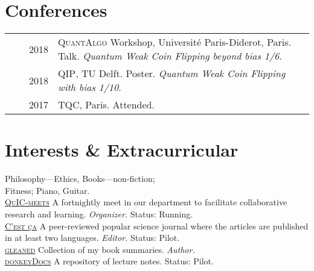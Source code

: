 \documentclass[a4paper,10pt]{article}
\begin{document}
\section{Conferences}
\begin{tabular}{rrp{11cm}}
  & ~~2018 &\textsc{QuantAlgo} Workshop, Université Paris-Diderot, Paris. Talk. \emph{Quantum Weak Coin Flipping beyond bias 1/6}. \\  
  & ~~2018 &\textsc{QIP}, TU Delft. Poster. \emph{Quantum Weak Coin Flipping with bias 1/10}. \\
  & ~~2017 &\textsc{TQC}, Paris. Attended.
  \end{tabular}


\section{Interests \& Extracurricular}
Philosophy---Ethics, Books---non-fiction; \\
Fitness; Piano, Guitar. \\

\textsc{\hyperlink{quic-meets.github.io}{QuIC-meets}} A fortnightly meet in our department to facilitate collaborative research and learning. \emph{Organizer.} Status: Running. \\
\textsc{\hyperlink{c-est-ca.github.io}{C'est ça}} A peer-reviewed popular science journal where the articles are published in at least two languages. \emph{Editor.} Status: Pilot. \\
\textsc{\hyperlink{gleaned.github.io}{gleaned}} Collection of my book summaries. \emph{Author.} \\
\textsc{\hyperlink{donkey-docs.github.io}{donkeyDocs}} A repository of lecture notes. Status: Pilot. \\
\end{document}
